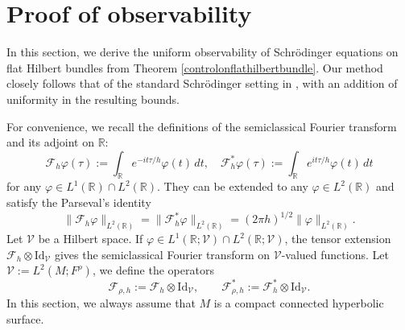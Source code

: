 \documentclass[11pt,oneside,reqno]{amsart}
\newcommand\R{\ensuremath{\mathbb{R}}}
\theoremstyle{definition}
\numberwithin{equation}{section}
\theoremstyle{plain}
\begin{document}
\section{Proof of observability}\label{sec: proof of observability}

In this section, we derive the uniform observability of Schrödinger equations on flat Hilbert bundles from Theorem \ref{controlonflathilbertbundle}. Our method closely follows that of the standard Schrödinger setting in \cite{jin2018control}, with an addition of uniformity in the resulting bounds.

For convenience, we recall the definitions of the semiclassical Fourier transform and its adjoint on $\R$:
\begin{equation*}
    \mathcal{F}_h\varphi(\tau):=\int_\R e^{-it\tau /h}\varphi(t)\,d t, \quad \mathcal{F}_h^*\varphi(\tau):=\int_\R e^{it\tau /h}\varphi(t)\,d t
\end{equation*}
for any $\varphi\in L^1(\R)\cap L^2(\R)$. They can be extended to any $\varphi \in L^2(\R)$ and satisfy the Parseval's identity
\begin{equation}\label{parseval}
    \| \mathcal{F}_h \varphi \|_{L^2(\R)}=\| \mathcal{F}_h^* \varphi \|_{L^2(\R)}=(2\pi h )^{1/2}\|\varphi\|_{L^2(\R)}.
\end{equation}
Let $\mathcal{V}$ be a Hilbert space. If $\varphi \in L^1(\mathbb{R};\mathcal{V})\cap  L^2(\mathbb{R};\mathcal{V})$, the tensor extension $\mathcal{F}_h\otimes\mathrm{Id}_{\mathcal{V}}$ gives the semiclassical Fourier transform on $\mathcal{V}$-valued functions. Let $\mathcal{V}:=L^2(M;F^{\rho})$, we define the operators 
\begin{equation*}
    \mathcal{F}_{\rho,h}:=\mathcal{F}_h\otimes\mathrm{Id}_{\mathcal{V}}, \qquad \mathcal{F}_{\rho,h}^{*}:=\mathcal{F}_h^*\otimes \mathrm{Id}_{\mathcal{V}}.
\end{equation*}
In this section, we always assume that $M$ is a compact connected hyperbolic surface.
\end{document}
